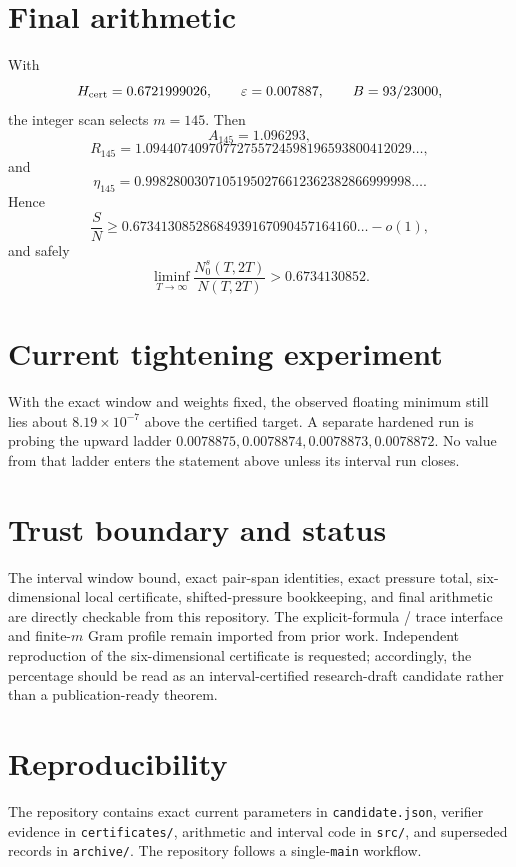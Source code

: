 \documentclass[11pt]{article}
\begin{document}
\section{Final arithmetic}
With
\[
H_{\rm cert}=0.6721999026,\qquad
\varepsilon=0.007887,\qquad B=93/23000,
\]
the integer scan selects $m=145$. Then
\[
A_{145}=1.096293,
\]
\[
R_{145}=1.09440740970772755724598196593800412029\ldots,
\]
and
\[
\eta_{145}=0.99828003071051950276612362382866999998\ldots.
\]
Hence
\[
\frac SN\ge0.67341308528684939167090457164160\ldots-o(1),
\]
and safely
\[
\boxed{\liminf_{T\to\infty}\frac{N_0^s(T,2T)}{N(T,2T)}>0.6734130852.}
\]

\section{Current tightening experiment}
With the exact window and weights fixed, the observed floating minimum still lies about $8.19\times10^{-7}$ above the certified target. A separate hardened run is probing the upward ladder $0.0078875,0.0078874,0.0078873,0.0078872$. No value from that ladder enters the statement above unless its interval run closes.

\section{Trust boundary and status}
The interval window bound, exact pair-span identities, exact pressure total, six-dimensional local certificate, shifted-pressure bookkeeping, and final arithmetic are directly checkable from this repository. The explicit-formula / trace interface and finite-$m$ Gram profile remain imported from prior work. Independent reproduction of the six-dimensional certificate is requested; accordingly, the percentage should be read as an interval-certified research-draft candidate rather than a publication-ready theorem.

\section*{Reproducibility}
The repository contains exact current parameters in \texttt{candidate.json}, verifier evidence in \texttt{certificates/}, arithmetic and interval code in \texttt{src/}, and superseded records in \texttt{archive/}. The repository follows a single-\texttt{main} workflow.
\end{document}
